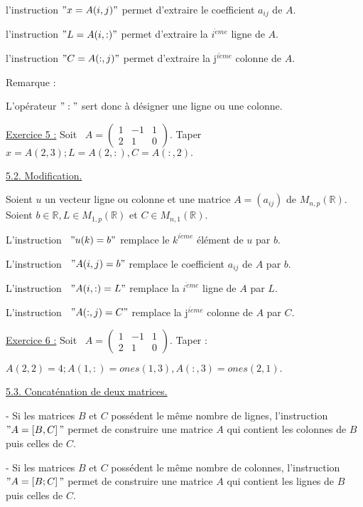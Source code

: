 \documentclass{article}
\begin{document}
l'instruction $"x=A(i,j)"$ permet d'extraire le coefficient $a_{ij}$ de $A.$

l'instruction $"L=A(i,:)"$ permet d'extraire la $i^{\grave{e}me}$ ligne de $%
A.$

l'instruction $"C=A(:,j)"$ permet d'extraire la j$^{i\grave{e}me}$ colonne
de $A.$

Remarque :

L'op\'{e}rateur $":"$ sert donc \`{a} d\'{e}signer une ligne ou une colonne.

\underline{Exercice 5 :} Soit \ $A=\left( 
\begin{array}{ccc}
1 & -1 & 1 \\ 
2 & 1 & 0%
\end{array}%
\right) .$ Taper $x=A(2,3);L=A(2,:),C=A(:,2).$

\underline{5.2. Modification.}

Soient $u$ un vecteur ligne ou colonne et une matrice $A=(a_{ij})$ de $%
M_{n,p}(%
\mathbb{R}
).$Soient $b\in 
\mathbb{R}
,L\in M_{1,p}(%
\mathbb{R}
)$ et $C\in M_{n,1}(%
\mathbb{R}
).$

L'instruction \ $"u(k)=b"$ remplace le $k^{i\grave{e}me}$ \'{e}l\'{e}ment de 
$u$ par $b.$

L'instruction \ $"A(i,j)=b"$ remplace le coefficient $a_{ij}$ de $A$ par $b.$

L'instruction \ $"A(i,:)=L"$ remplace la $i^{\grave{e}me}$ ligne de $A$ par $%
L.$

L'instruction \ $"A(:,j)=C"$ remplace la j$^{i\grave{e}me}$ colonne de $A$
par $C.$

\bigskip \underline{Exercice 6 :} Soit \ $A=\left( 
\begin{array}{ccc}
1 & -1 & 1 \\ 
2 & 1 & 0%
\end{array}%
\right) .$ Taper :

$A(2,2)=4;A(1,:)=ones(1,3),A(:,3)=ones(2,1).$

\underline{5.3. Concat\'{e}nation de deux matrices.}

- Si les matrices $B$ et $C$ poss\'{e}dent le m\^{e}me nombre de lignes,
l'instruction $"A=\left[ B,C\right] "$ permet de construire une matrice $A$
qui contient les colonnes de $B$ puis celles de $C.$

- Si les matrices $B$ et $C$ poss\'{e}dent le m\^{e}me nombre de colonnes,
l'instruction $"A=\left[ B;C\right] "$ permet de construire une matrice $A$
qui contient les lignes de $B$ puis celles de $C.$
\end{document}
